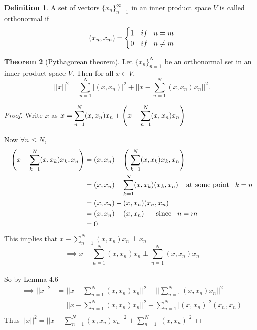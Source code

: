 \documentclass[11pt,a4paper]{article}
\theoremstyle{definition}
\newtheorem{thm}{Theorem}[section]
\newtheorem{defn}[thm]{Definition}
\begin{document}
\begin{defn}
A set of vectors $\{x_n\}^{\infty}_{n=1}$ in an inner product space $V$ is called orthonormal if 
\[ (x_n,x_m)=
\begin{cases}
1 &if\hspace{0.3cm} n=m\\
0 &if\hspace{0.3cm} n\neq m
\end{cases}
\]
\end{defn}


\begin{thm}[Pythagorean theorem]
Let $\{x_n\}^{N}_{n=1}$ be an orthonormal set in an inner product space $V$. Then for all $x\in V$, $$||x||^2=\sum^{N}_{n=1}|(x,x_n)|^2+\Bigg|\Bigg|x-\sum^N_{n=1}(x,x_n)x_n\Bigg|\Bigg|^2.$$
\end{thm}


\begin{proof}
Write $x$ as \hspace{0.3cm}$\displaystyle{x=\sum^N_{n=1}(x,x_n)x_n+\Bigg(x-\sum^N_{n=1}(x,x_n)x_n\Bigg)}\hspace{0.2cm}$

 Now $\forall n\leq N$,
\begin{align*}
\Bigg(x-\sum^N_{k=1}(x,x_k)x_k,x_n\Bigg) &=(x,x_n)-\Bigg(\sum^N_{k=1}(x,x_k)x_k,x_n\Bigg)\\
                                         &=(x,x_n)-\sum^N_{k=1}(x,x_k)(x_k,x_n)\hspace{0.4cm} \text{at some point}\hspace{0.3cm} k=n\\
                                         &=(x,x_n)-(x,x_n)(x_n,x_n)\\
                                         &=(x,x_n)-(x,x_n)\hspace{0.6cm} \text{since}\hspace{0.3cm} n=m\\
                                         &=0
\end{align*}
This implies that \hspace{0.2cm}$\displaystyle{x-\sum^N_{n=1}(x,x_n)x_n\perp x_n}$ $$\implies x-\sum^N_{n=1}(x,x_n)x_n\perp \sum^N_{n=1}(x,x_n)x_n$$\\ So by Lemma 4.6
\begin{align*}
\implies ||x||^2 &=\Bigg|\Bigg|x-\sum^N_{n=1}(x,x_n)x_n\Bigg|\Bigg|^2+\Bigg|\Bigg|\sum^N_{n=1}(x,x_n)x_n\Bigg|\Bigg|^2\\
                 &=\Bigg|\Bigg|x-\sum^N_{n=1}(x,x_n)x_n\Bigg|\Bigg|^2+\sum^N_{n=1}|(x,x_n)|^2(x_n,x_n)\\
\end{align*}
Thus \hspace{0.3cm}$\displaystyle{||x||^2=\Bigg|\Bigg|x-\sum^N_{n=1}(x,x_n)x_n\Bigg|\Bigg|^2+\sum^N_{n=1}|(x,x_n)|^2}$

\end{proof}
\end{document}
